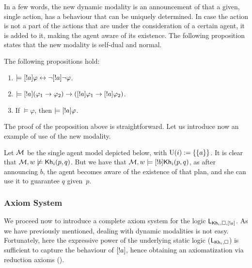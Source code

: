 In a few words, the new dynamic modality is an announcement of that a given, single action, has a behaviour that can be uniquely determined. In case the action is not a part of the actions that are under the consideration of a certain agent, it is added to it, making the agent aware of its existence. 
The following proposition states that the new modality is self-dual and normal.
\begin{proposition} The following propositions hold:
\begin{enumerate}
\item $\models [!a]\varphi \leftrightarrow \neg[!a]\neg\varphi$. 
\item $\models [!a](\varphi_1 \rightarrow \varphi_2) \rightarrow ([!a]\varphi_1 \rightarrow [!a]\varphi_2)$.
\item If $\models \varphi$, then $\models [!a]\varphi$.
\end{enumerate}
\end{proposition}

The proof of the proposition above is straightforward. Let us introduce now an example of use of the new modality.

\begin{example}
Let $\mathcal{M}$ be the single agent model depicted below, with $\operatorname{U}(i):=\{ \{ a \} \}$. It is clear that $\mathcal{M},w\not\models{\sf Kh}_i(p,q)$. But we have that $\mathcal{M},w\models[!b]{\sf Kh}_i(p,q)$, as after announcing $b$, the agent becomes aware of the existence of that plan, and she can use it to guarantee $q$ given~$p$. 
\begin{center}
\end{center} 
\end{example}

\subsubsection{Axiom System}

We proceed now to introduce a complete axiom system for the logic $\mathsf{L}_{{\sf Kh}_i,\square,[!a]}$. As we have previously mentioned, dealing with dynamic modalities is not easy. Fortunately, here the expressive power of the underlying static logic ($\mathsf{L}_{{\sf Kh}_i,\square}$) is sufficient to capture the behaviour of $[!a]$, hence obtaining an axiomatization via reduction axioms ().

